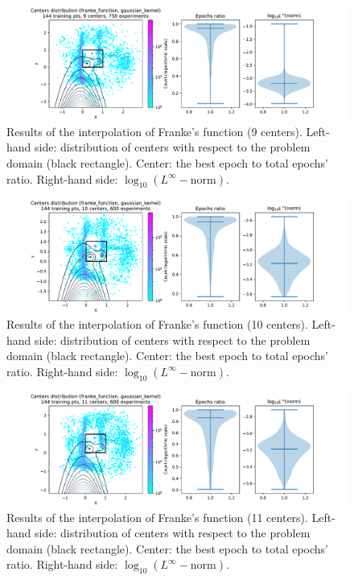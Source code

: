 \documentclass[12pt]{report} %
\begin{document}
\begin{figure}[H]
  \includegraphics[width=\textwidth, trim={2cm 0 2.8cm 0}, clip=true]{imagenes/experiments/2d/franke_interpolation/tr12_c9_franke_function_gaussian_kernel.pdf}
  \caption{Results of the interpolation of Franke's function (9 centers).
    Left-hand side: distribution of centers with respect to the problem domain (black rectangle). Center: the best epoch to total epochs' ratio.
    Right-hand side: $\log_{10}(L^\infty-\text{norm})$.}
  \label{fig:franke-tr12-c9}
\end{figure}
\begin{figure}[H]
  \includegraphics[width=\textwidth, trim={2cm 0 2.8cm 0}, clip=true]{imagenes/experiments/2d/franke_interpolation/tr12_c10_franke_function_gaussian_kernel.pdf}
  \caption{Results of the interpolation of Franke's function (10 centers).
    Left-hand side: distribution of centers with respect to the problem domain (black rectangle). Center: the best epoch to total epochs' ratio.
    Right-hand side: $\log_{10}(L^\infty-\text{norm})$.}
  \label{fig:franke-tr12-c10}
\end{figure}
\begin{figure}[H]
  \includegraphics[width=\textwidth, trim={2cm 0 2.8cm 0}, clip=true]{imagenes/experiments/2d/franke_interpolation/tr12_c11_franke_function_gaussian_kernel.pdf}
  \caption{Results of the interpolation of Franke's function (11 centers).
    Left-hand side: distribution of centers with respect to the problem domain (black rectangle). Center: the best epoch to total epochs' ratio.
    Right-hand side: $\log_{10}(L^\infty-\text{norm})$.}
  \label{fig:franke-tr12-c11}
\end{figure}
\end{document}
